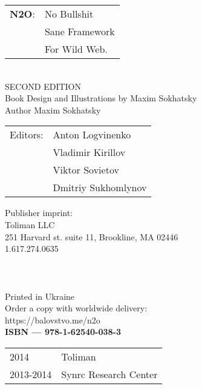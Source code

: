 \begingroup
\topskip 20pt
\parindent 0pt
\parskip
\baselineskip

\begin{tabular}{ll}
{\bf N2O}: & No Bullshit \\
    & Sane Framework \\
    & For Wild Web. \\
\end{tabular}
\\

SECOND EDITION \\

Book Design and Illustrations by Maxim Sokhatsky \\
Author Maxim Sokhatsky \\

\begin{tabular}{ll}
Editors: & Anton Logvinenko \\
         & Vladimir Kirillov \\
         & Viktor Sovietov \\
         & Dmitriy Sukhomlynov \\
\end{tabular}

Publisher imprint: \\
Toliman LLC \\
251 Harvard st. suite 11, Brookline, MA 02446 \\
1.617.274.0635 \\
\\
\\
\\




Printed in Ukraine \\

Order a copy with worldwide delivery: \\
https://balovstvo.me/n2o \\

{\bf  ISBN — 978-1-62540-038-3\hspace{2em}}

\begin{tabular}{ll}
\textcopyright{} 2014 & Toliman \\
\textcopyright{} 2013-2014 & Synrc Research Center
\end{tabular}

\endgroup

   \thispagestyle{empty}
